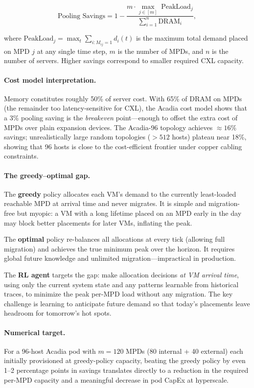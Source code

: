 \documentclass[11pt]{article}
\begin{document}
\[
    \text{Pooling Savings} = 1 -
    \frac{m \cdot \max_{j \in [m]} \; \text{PeakLoad}_j}
         {\sum_{i=1}^{n} \text{DRAM}_i},
\]

where $\text{PeakLoad}_j = \max_{t} \sum_{i : M_{ij}=1} d_i(t)$ is the maximum
total demand placed on MPD $j$ at any single time step, $m$ is the number of
MPDs, and $n$ is the number of servers.  Higher savings correspond to smaller
required CXL capacity.

\paragraph{Cost model interpretation.}
Memory constitutes roughly 50\% of server cost.  With 65\% of DRAM on MPDs
(the remainder too latency-sensitive for CXL), the Acadia cost model shows that
a 3\% pooling saving is the \emph{breakeven} point---enough to offset the extra
cost of MPDs over plain expansion devices.  The Acadia-96 topology achieves
$\approx 16\%$ savings; unrealistically large random topologies ($>512$ hosts)
plateau near 18\%, showing that 96 hosts is close to the cost-efficient frontier
under copper cabling constraints.

\paragraph{The greedy--optimal gap.}
The \textbf{greedy} policy allocates each VM's demand to the currently
least-loaded reachable MPD at arrival time and never migrates.  It is simple
and migration-free but myopic: a VM with a long lifetime placed on an MPD early
in the day may block better placements for later VMs, inflating the peak.

The \textbf{optimal} policy re-balances all allocations at every tick (allowing
full migration) and achieves the true minimum peak over the horizon.  It
requires global future knowledge and unlimited migration---impractical in
production.

The \textbf{RL agent} targets the gap: make allocation decisions \emph{at VM
arrival time}, using only the current system state and any patterns learnable
from historical traces, to minimize the peak per-MPD load without any
migration.  The key challenge is learning to anticipate future demand so that
today's placements leave headroom for tomorrow's hot spots.

\paragraph{Numerical target.}
For a 96-host Acadia pod with $m = 120$ MPDs (80 internal + 40 external) each
initially provisioned at greedy-policy capacity, beating the greedy policy by
even 1--2 percentage points in savings translates directly to a reduction in the
required per-MPD capacity and a meaningful decrease in pod CapEx at hyperscale.
\end{document}
